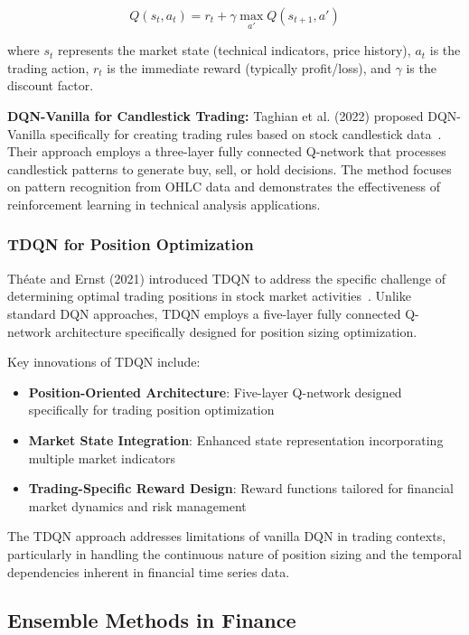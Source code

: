 \documentclass[10pt,twocolumn]{article}
\begin{document}
\begin{equation}
Q(s_t, a_t) = r_t + \gamma \max_{a'} Q(s_{t+1}, a')
\end{equation}

where $s_t$ represents the market state (technical indicators, price history), $a_t$ is the trading action, $r_t$ is the immediate reward (typically profit/loss), and $\gamma$ is the discount factor.

\textbf{DQN-Vanilla for Candlestick Trading:} Taghian et al. (2022) proposed DQN-Vanilla specifically for creating trading rules based on stock candlestick data~\cite{dqn_vanilla_taghian}. Their approach employs a three-layer fully connected Q-network that processes candlestick patterns to generate buy, sell, or hold decisions. The method focuses on pattern recognition from OHLC data and demonstrates the effectiveness of reinforcement learning in technical analysis applications.

\subsubsection{TDQN for Position Optimization}
Théate and Ernst (2021) introduced TDQN to address the specific challenge of determining optimal trading positions in stock market activities~\cite{tdqn_theate}. Unlike standard DQN approaches, TDQN employs a five-layer fully connected Q-network architecture specifically designed for position sizing optimization.

Key innovations of TDQN include:
\begin{itemize}[itemsep=1pt]
\item \textbf{Position-Oriented Architecture}: Five-layer Q-network designed specifically for trading position optimization
\item \textbf{Market State Integration}: Enhanced state representation incorporating multiple market indicators
\item \textbf{Trading-Specific Reward Design}: Reward functions tailored for financial market dynamics and risk management
\end{itemize}

The TDQN approach addresses limitations of vanilla DQN in trading contexts, particularly in handling the continuous nature of position sizing and the temporal dependencies inherent in financial time series data.

\subsection{Ensemble Methods in Finance}
\end{document}
